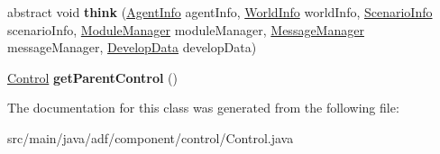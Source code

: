 \begin{DoxyCompactItemize}
\item 
\hypertarget{classadf_1_1component_1_1control_1_1Control_af7a9de770482255a8a6619217bf36598}{}\label{classadf_1_1component_1_1control_1_1Control_af7a9de770482255a8a6619217bf36598} 
abstract void {\bfseries think} (\hyperlink{classadf_1_1agent_1_1info_1_1AgentInfo}{Agent\+Info} agent\+Info, \hyperlink{classadf_1_1agent_1_1info_1_1WorldInfo}{World\+Info} world\+Info, \hyperlink{classadf_1_1agent_1_1info_1_1ScenarioInfo}{Scenario\+Info} scenario\+Info, \hyperlink{classadf_1_1agent_1_1module_1_1ModuleManager}{Module\+Manager} module\+Manager, \hyperlink{classadf_1_1agent_1_1communication_1_1MessageManager}{Message\+Manager} message\+Manager, \hyperlink{classadf_1_1agent_1_1develop_1_1DevelopData}{Develop\+Data} develop\+Data)
\item 
\hypertarget{classadf_1_1component_1_1control_1_1Control_adccbe65c8b9e73ebb17d8dd53273f41d}{}\label{classadf_1_1component_1_1control_1_1Control_adccbe65c8b9e73ebb17d8dd53273f41d} 
\hyperlink{classadf_1_1component_1_1control_1_1Control}{Control} {\bfseries get\+Parent\+Control} ()
\end{DoxyCompactItemize}


The documentation for this class was generated from the following file\+:\begin{DoxyCompactItemize}
\item 
src/main/java/adf/component/control/Control.\+java\end{DoxyCompactItemize}

